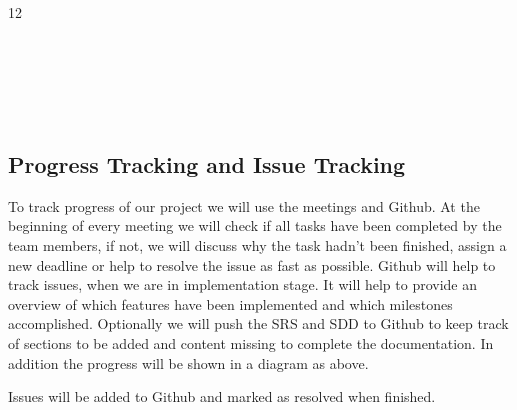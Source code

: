 \documentclass[11pt,a4paper]{article}
\begin{document}
\begin{center}
{\begin{ganttchart}[ hgrid,  vgrid, inline, x unit=1.2cm, ,
y unit chart=0.9cm, bar/.style={fill=green},
%
incomplete/.style={fill=yellow},
today = 1
]{12}
 \\

 \\

 \\
\\
\\
 \\

\end{ganttchart}}


\end{center}


\subsection{Progress Tracking and Issue Tracking}

To track progress of our project we will use the meetings and Github. At the beginning of every meeting we will check if all tasks have been completed by the team members, if not, we will discuss why the task hadn't been finished, assign a new deadline or help to resolve the issue as fast as possible. Github will help to track issues, when we are in implementation stage. It will help to provide an overview of which features have been implemented and which milestones accomplished. Optionally we will push the SRS and SDD to Github to keep track of sections to be added and content missing to complete the documentation. In addition the progress will be shown in a diagram as above.

Issues will be added to Github and marked as resolved when finished. 
\end{document}
